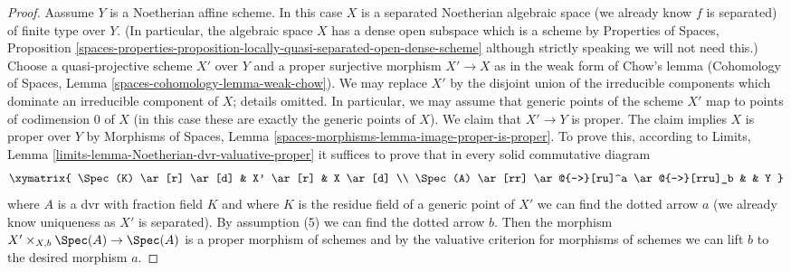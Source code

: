 \begin{proof}
\medskip\noindent
Aassume $Y$ is a Noetherian affine scheme. In this case $X$ is a
separated Noetherian algebraic space (we already know $f$ is separated)
of finite type over $Y$. (In particular, the algebraic space $X$
has a dense open subspace which is a scheme by Properties of Spaces, Proposition
\ref{spaces-properties-proposition-locally-quasi-separated-open-dense-scheme}
although strictly speaking we will not need this.)
Choose a quasi-projective scheme $X'$ over $Y$ and a proper surjective
morphism $X' \to X$ as in the weak form of Chow's lemma
(Cohomology of Spaces, Lemma \ref{spaces-cohomology-lemma-weak-chow}).
We may replace $X'$ by the disjoint union of the irreducible components
which dominate an irreducible component of $X$; details omitted.
In particular, we may assume that generic points of the scheme $X'$ map to
points of codimension $0$ of $X$ (in this case these are exactly
the generic points of $X$). We claim that $X' \to Y$ is proper.
The claim implies $X$ is proper over $Y$ by
Morphisms of Spaces, Lemma \ref{spaces-morphisms-lemma-image-proper-is-proper}.
To prove this, according to
Limits, Lemma \ref{limits-lemma-Noetherian-dvr-valuative-proper}
it suffices to prove that in every solid commutative diagram
$$
\xymatrix{
\Spec(K) \ar[r] \ar[d] & X' \ar[r] & X \ar[d] \\
\Spec(A) \ar[rr] \ar@{-->}[ru]^a \ar@{-->}[rru]_b & & Y
}
$$
where $A$ is a dvr with fraction field $K$ and where $K$ is the residue
field of a generic point of $X'$ we can find the
dotted arrow $a$ (we already know uniqueness as $X'$ is separated).
By assumption (5) we can find the dotted arrow $b$.
Then the morphism $X' \times_{X, b} \Spec(A) \to \Spec(A)$
is a proper morphism of schemes and by the valuative criterion
for morphisms of schemes we can lift $b$ to the desired morphism $a$.
\end{proof}

